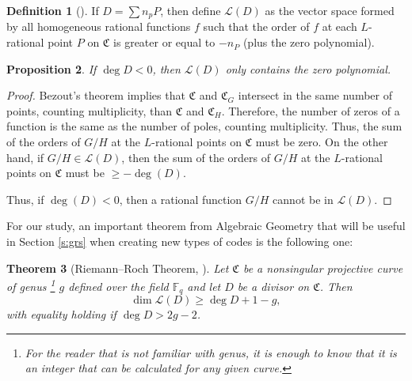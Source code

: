 \documentclass[11pt, oneside]{amsart}
\newtheorem{thm}{Theorem}[section]
\newtheorem{prop}[thm]{Proposition}
\theoremstyle{definition}
\newtheorem{defn}[thm]{Definition}
\theoremstyle{remark}
\numberwithin{equation}{section}
\begin{document}

\begin{defn}[\cite{LS87}]
	If $D = \sum n_p P$, then define $\mathcal L(D)$ as the vector space formed by all homogeneous rational functions $f$ such that the order of $f$ at each $L$-rational point $P$ on $\mathfrak C$ is greater or equal to $-n_P$ (plus the zero polynomial).
\end{defn}

\begin{prop}\label{prop:degDlt0}
	If $\deg D < 0$, then $\mathcal L(D)$ only contains the zero polynomial.
\end{prop}

\begin{proof}
	Bezout's theorem implies that $\mathfrak C$ and $\mathfrak C_G$ intersect in the same number of points, counting multiplicity, than $\mathfrak C$ and $\mathfrak C_H$. Therefore, the number of zeros of a function is the same as the number of poles, counting multiplicity. Thus, the sum of the orders of $G/H$ at the $L$-rational points on $\mathfrak C$ must be zero. On the other hand, if $G/H \in \mathcal L(D)$, then the sum of the orders of $G/H$ at the $L$-rational points on $\mathfrak C$ must be $\ge - \deg(D)$.

	Thus, if $\deg(D) < 0$, then a rational function $G/H$ cannot be in $\mathcal L(D)$.
\end{proof}

For our study, an important theorem from Algebraic Geometry that will be useful in Section \ref{s:grs} when creating new types of codes is the following one:
\begin{thm}[Riemann--Roch Theorem, \cite{Wal00}]
	Let $\mathfrak C$ be a nonsingular projective curve of genus%
	\footnote{For the reader that is not familiar with genus, it is enough to know that it is an integer that can be calculated for any given curve.}
	$g$ defined over the field $\mathbb{F}_q$ and let $D$ be a divisor on $\mathfrak C$.
	Then
	\begin{equation}
		\dim \mathcal L(D) \ge \deg D + 1 - g,
	\end{equation}
	with equality holding if $\deg D > 2g - 2$.
\end{thm}
\end{document}
